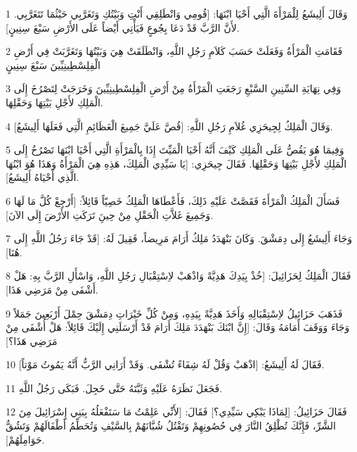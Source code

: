 \par 1 وَقَالَ أَلِيشَعُ لِلْمَرْأَةَ الَّتِي أَحْيَا ابْنَهَا: [قُومِي وَانْطَلِقِي أَنْتِ وَبَيْتُكِ وَتَغَرَّبِي حَيْثُمَا تَتَغَرَّبِي. لأَنَّ الرَّبَّ قَدْ دَعَا بِجُوعٍ فَيَأْتِي أَيْضاً عَلَى الأَرْضِ سَبْعَ سِنِينٍ].
\par 2 فَقَامَتِ الْمَرْأَةُ وَفَعَلَتْ حَسَبَ كَلاَمِ رَجُلِ اللَّهِ، وَانْطَلَقَتْ هِيَ وَبَيْتُهَا وَتَغَرَّبَتْ فِي أَرْضِ الْفِلِسْطِينِيِّينَ سَبْعَ سِنِينٍ
\par 3 وَفِي نِهَايَةِ السِّنِينِ السَّبْعِ رَجَعَتِ الْمَرْأَةُ مِنْ أَرْضِ الْفِلِسْطِينِيِّينَ وَخَرَجَتْ لِتَصْرُخَ إِلَى الْمَلِكِ لأَجْلِ بَيْتِهَا وَحَقْلِهَا.
\par 4 وَقَالَ الْمَلِكُ لِجِيحَزِي غُلاَمِ رَجُلِ اللَّهِ: [قُصَّ عَلَيَّ جَمِيعَ الْعَظَائِمِ الَّتِي فَعَلَهَا أَلِيشَعُ].
\par 5 وَفِيمَا هُوَ يَقُصُّ عَلَى الْمَلِكِ كَيْفَ أَنَّهُ أَحْيَا الْمَيِّتَ إِذَا بِالْمَرْأَةِ الَّتِي أَحْيَا ابْنَهَا تَصْرُخُ إِلَى الْمَلِكِ لأَجْلِ بَيْتِهَا وَحَقْلِهَا. فَقَالَ جِيحَزِي: [يَا سَيِّدِي الْمَلِكَ، هَذِهِ هِيَ الْمَرْأَةُ وَهَذَا هُوَ ابْنُهَا الَّذِي أَحْيَاهُ أَلِيشَعُ].
\par 6 فَسَأَلَ الْمَلِكُ الْمَرْأَةَ فَقَصَّتْ عَلَيْهِ ذَلِكَ، فَأَعْطَاهَا الْمَلِكُ خَصِيّاً قَائِلاً: [أَرْجِعْ كُلَّ مَا لَهَا وَجَمِيعَ غَلاَّتِ الْحَقْلِ مِنْ حِينَِ تَرَكَتِ الأَرْضَ إِلَى الآنَ].
\par 7 وَجَاءَ أَلِيشَعُ إِلَى دِمَشْقَ. وَكَانَ بَنْهَدَدُ مَلِكُ أَرَامَ مَرِيضاً، فَقِيلَ لَهُ: [قَدْ جَاءَ رَجُلُ اللَّهِ إِلَى هُنَا].
\par 8 فَقَالَ الْمَلِكُ لِحَزَائِيلَ: [خُذْ بِيَدِكَ هَدِيَّةً وَاذْهَبْ لاِسْتِقْبَالِ رَجُلِ اللَّهِ، وَاسْأَلِ الرَّبَّ بِهِ: هَلْ أَشْفَى مِنْ مَرَضِي هَذَا].
\par 9 فَذَهَبَ حَزَائِيلُ لاِسْتِقْبَالِهِ وَأَخَذَ هَدِيَّةً بِيَدِهِ، وَمِنْ كُلِّ خَيْرَاتِ دِمَشْقَ حِمْلَ أَرْبَعِينَ جَمَلاً وَجَاءَ وَوَقَفَ أَمَامَهُ وَقَالَ: [إِنَّ ابْنَكَ بَنْهَدَدَ مَلِكَ أَرَامَ قَدْ أَرْسَلَنِي إِلَيْكَ قَائِلاً: هَلْ أُشْفَى مِنْ مَرَضِي هَذَا؟]
\par 10 فَقَالَ لَهُ أَلِيشَعُ: [اذْهَبْ وَقُلْ لَهُ شِفَاءً تُشْفَى. وَقَدْ أَرَانِي الرَّبُّ أَنَّهُ يَمُوتُ مَوْتاً].
\par 11 فَجَعَلَ نَظَرَهُ عَلَيْهِ وَثَبَّتَهُ حَتَّى خَجِلَ. فَبَكَى رَجُلُ اللَّهِ.
\par 12 فَقَالَ حَزَائِيلُ: [لِمَاذَا يَبْكِي سَيِّدِي؟] فَقَالَ: [لأَنِّي عَلِمْتُ مَا سَتَفْعَلُهُ بِبَنِي إِسْرَائِيلَ مِنَ الشَّرِّ، فَإِنَّكَ تُطْلِقُ النَّارَ فِي حُصُونِهِمْ وَتَقْتُلُ شُبَّانَهُمْ بِالسَّيْفِ وَتُحَطِّمُ أَطْفَالَهُمْ وَتَشُقُّ حَوَامِلَهُمْ].
